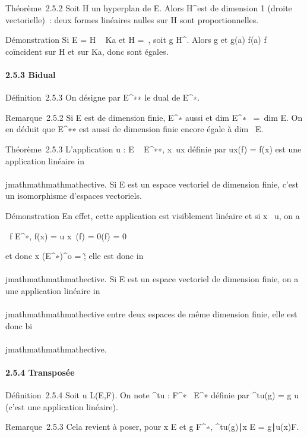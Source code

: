 Théorème~2.5.2 Soit H un hyperplan de E. Alors H^\bot est de
dimension 1 (droite vectorielle)~: deux formes linéaires nulles sur H
sont proportionnelles.

Démonstration Si E = H \oplus~ Ka et H =\
\mathrmKerf, soit g \in H^\bot. Alors g et 
g(a) \over f(a) f coïncident sur H et sur Ka, donc sont
égales.

\paragraph{2.5.3 Bidual}

Définition~2.5.3 On désigne par E^∗∗ le dual de
E^∗.

Remarque~2.5.2 Si E est de dimension finie, E^∗ aussi et
dim E^∗~ =\
dim E. On en déduit que E^∗∗ est aussi de dimension finie
encore égale à dim~ E.

Théorème~2.5.3 L'application u : E \rightarrow~ E^∗∗,
x\mapsto~ux définie par ux(f) =
f(x) est une application linéaire in\\\\jmathmathmathmathective. Si E est un espace
vectoriel de dimension finie, c'est un isomorphisme d'espaces
vectoriels.

Démonstration En effet, cette application est visiblement linéaire et si
x \in\mathrmKer~u, on a

\forall~f \in E^∗, f(x) = u x~(f) =
0(f) = 0

et donc x \in (E^∗)^o =
\0\~; elle est donc in\\\\jmathmathmathmathective. Si E
est un espace vectoriel de dimension finie, on a une application
linéaire in\\\\jmathmathmathmathective entre deux espaces de même dimension finie, elle est
donc bi\\\\jmathmathmathmathective.

\paragraph{2.5.4 Transposée}

Définition~2.5.4 Soit u \in L(E,F). On note ^tu :
F^∗\rightarrow~ E^∗ définie par ^tu(g) = g \cdot u
(c'est une application linéaire).

Remarque~2.5.3 Cela revient à poser, pour x \in E et g \in F^∗,
\langle
^tu(g)∣x\rangle
E =\langle
g∣u(x)\rangle F.

